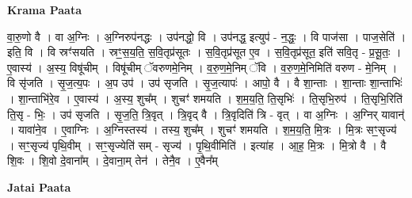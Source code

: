 \documentclass[17pt]{extarticle}
\begin{document}
\textbf{Krama Paata} \newline

वा॒रु॒णो वै । वा अ॒ग्निः । अ॒ग्निरुप॑नद्धः । उप॑नद्धो॒ वि । उप॑नद्ध॒ इत्युप॑ - न॒द्धः॒ । वि पाज॑सा । पाज॒सेति॑ । इति॒ वि । वि स्रꣳ॑सयति । स्रꣳ॒॒स॒य॒ति॒ स॒वि॒तृप्र॑सूतः । स॒वि॒तृप्र॑सूत ए॒व । स॒वि॒तृप्र॑सूत॒ इति॑ सवि॒तृ - प्र॒सू॒तः॒ । ए॒वास्य॑ । अ॒स्य॒ विषू॑चीम् । विषू॑चीम् ॅवरुणमे॒निम् । व॒रु॒ण॒मे॒निम् ॅवि । व॒रु॒ण॒मे॒निमिति॑ वरुण - मे॒निम् । वि सृ॑जति । सृ॒ज॒त्य॒पः । अ॒प उप॑ । उप॑ सृजति । सृ॒ज॒त्यापः॑ । आपो॒ वै । वै शा॒न्ताः । शा॒न्ताः शा॒न्ताभिः॑ । शा॒न्ताभि॑रे॒व । ए॒वास्य॑ । अ॒स्य॒ शुच᳚म् । शुचꣳ॑ शमयति । श॒म॒य॒ति॒ ति॒सृभिः॑ । ति॒सृभि॒रुप॑ । ति॒सृभि॒रिति॑ ति॒सृ - भिः॒ । उप॑ सृजति । सृ॒ज॒ति॒ त्रि॒वृत् । त्रि॒वृद् वै । त्रि॒वृदिति॑ त्रि - वृत् । वा अ॒ग्निः । अ॒ग्निर् यावान्॑ । यावा॑ने॒व । ए॒वाग्निः । अ॒ग्निस्तस्य॑ । तस्य॒ शुच᳚म् । शुचꣳ॑ शमयति । श॒म॒य॒ति॒ मि॒त्रः । मि॒त्रः सꣳ॒॒सृज्य॑ । सꣳ॒॒सृज्य॑ पृथि॒वीम् । सꣳ॒॒सृज्येति॑ सम् - सृज्य॑ । पृ॒थि॒वीमिति॑ । इत्या॑ह । आ॒ह॒ मि॒त्रः । मि॒त्रो वै । वै शि॒वः । शि॒वो दे॒वाना᳚म् । दे॒वाना॒म् तेन॑ । तेनै॒व । ए॒वैन᳚म् \newline

\textbf{Jatai Paata} \newline
\end{document}
